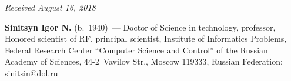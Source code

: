 \vspace*{-6pt}

\hfill{\small\textit{Received August 16, 2018}}


\vspace*{-24pt}



\Contrl

\noindent
\textbf{Sinitsyn Igor N.} (b.\ 1940)~--- 
Doctor of Science in technology, professor, Honored scientist of RF, 
principal scientist, Institute of Informatics Problems, 
Federal Research Center ``Computer Science and Control'' 
of the Russian Academy of Sciences, 44-2~Vavilov Str., Moscow 119333, 
Russian Federation; \mbox{sinitsin@dol.ru}
\label{end\stat}

\renewcommand{\bibname}{\protect\rm Литература}       